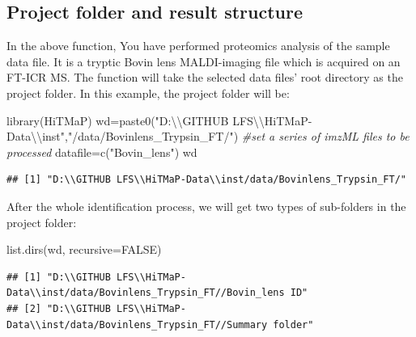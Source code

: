 \documentclass[
]{article}
\newenvironment{Shaded}{\begin{snugshade}}{\end{snugshade}}
\newcommand{\AttributeTok}[1]{\textcolor[rgb]{0.77,0.63,0.00}{#1}}
\newcommand{\CommentTok}[1]{\textcolor[rgb]{0.56,0.35,0.01}{\textit{#1}}}
\newcommand{\ConstantTok}[1]{\textcolor[rgb]{0.00,0.00,0.00}{#1}}
\newcommand{\FunctionTok}[1]{\textcolor[rgb]{0.00,0.00,0.00}{#1}}
\newcommand{\NormalTok}[1]{#1}
\newcommand{\OtherTok}[1]{\textcolor[rgb]{0.56,0.35,0.01}{#1}}
\newcommand{\SpecialCharTok}[1]{\textcolor[rgb]{0.00,0.00,0.00}{#1}}
\newcommand{\StringTok}[1]{\textcolor[rgb]{0.31,0.60,0.02}{#1}}
\begin{document}
\hypertarget{project-folder-and-result-structure}{%
\subsection{Project folder and result
structure}\label{project-folder-and-result-structure}}

In the above function, You have performed proteomics analysis of the
sample data file. It is a tryptic Bovin lens MALDI-imaging file which is
acquired on an FT-ICR MS. The function will take the selected data
files' root directory as the project folder. In this example, the
project folder will be:

\begin{Shaded}
\begin{Highlighting}[]
\FunctionTok{library}\NormalTok{(HiTMaP)}
\NormalTok{wd}\OtherTok{=}\FunctionTok{paste0}\NormalTok{(}\StringTok{"D:}\SpecialCharTok{\textbackslash{}\textbackslash{}}\StringTok{GITHUB LFS}\SpecialCharTok{\textbackslash{}\textbackslash{}}\StringTok{HiTMaP{-}Data}\SpecialCharTok{\textbackslash{}\textbackslash{}}\StringTok{inst"}\NormalTok{,}\StringTok{"/data/Bovinlens\_Trypsin\_FT/"}\NormalTok{)}
\CommentTok{\#set a series of imzML files to be processed}
\NormalTok{datafile}\OtherTok{=}\FunctionTok{c}\NormalTok{(}\StringTok{"Bovin\_lens"}\NormalTok{)}
\NormalTok{wd}
\end{Highlighting}
\end{Shaded}

\begin{verbatim}
## [1] "D:\\GITHUB LFS\\HiTMaP-Data\\inst/data/Bovinlens_Trypsin_FT/"
\end{verbatim}

After the whole identification process, we will get two types of
sub-folders in the project folder:

\begin{Shaded}
\begin{Highlighting}[]
\FunctionTok{list.dirs}\NormalTok{(wd, }\AttributeTok{recursive=}\ConstantTok{FALSE}\NormalTok{)}
\end{Highlighting}
\end{Shaded}

\begin{verbatim}
## [1] "D:\\GITHUB LFS\\HiTMaP-Data\\inst/data/Bovinlens_Trypsin_FT//Bovin_lens ID" 
## [2] "D:\\GITHUB LFS\\HiTMaP-Data\\inst/data/Bovinlens_Trypsin_FT//Summary folder"
\end{verbatim}
\end{document}
